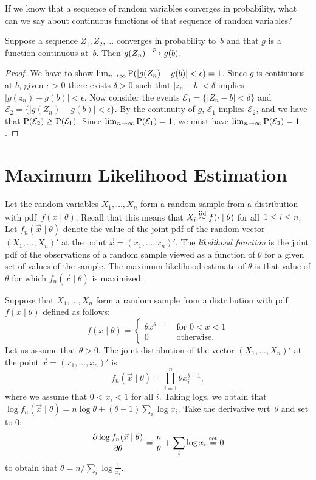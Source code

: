 If we know that a sequence of random variables converges in probability, what 
can we say about continuous functions of that sequence of random variables?
\begin{theorem}
Suppose a sequence $Z_1, Z_2, \ldots$ converges in probability to~$b$ and 
that $g$ is a function continuous at~$b$. Then $g(Z_n) \stackrel{p}{\longrightarrow} g(b)$.
\end{theorem} 
\begin{proof}
We have to show $\lim_{n \to \infty} \operatorname{P} (|g(Z_n) - g(b)| < \epsilon) = 1$. 
Since $g$ is continuous at $b$, given $\epsilon > 0$ there exists $\delta > 0$
such that $|z_n - b| < \delta$ implies $|g(z_n) -  g(b)| < \epsilon$. Now consider
the events $\mathcal{E}_1 = \{ |Z_n - b| < \delta \}$ and 
$\mathcal{E}_2 = \{|g(Z_n) - g(b)| < \epsilon\}$. By the continuity of $g$, 
$\mathcal{E}_1$ implies $\mathcal{E}_2$, and we have that 
$\operatorname{P} (\mathcal{E}_2) \geq \operatorname{P} (\mathcal{E}_1)$. 
Since $\lim_{n \to \infty} \operatorname{P} (\mathcal{E}_1) = 1$, we must have  
$\lim_{n \to \infty} \operatorname{P} (\mathcal{E}_2) = 1$. 
\end{proof}

\section{Maximum Likelihood Estimation}
Let the random variables $X_1, \ldots, X_n$ form a random sample from a 
distribution with pdf~$f(x \mid \theta)$. Recall that this means that 
$X_i \stackrel{\text{iid}}{\sim} f( \cdot \mid \theta)$ for all~$1 \leq i \leq n$. 
Let $f_n(\vec{x} \mid \theta)$ denote the value of the joint pdf of 
the random vector $(X_1, \ldots, X_n)'$ at the point 
$\vec{x} = (x_1, \ldots, x_n)'$. The \emph{likelihood function} is the joint pdf 
of the observations of a random sample viewed as a function of $\theta$ for 
a given set of values of the sample. The maximum likelihood estimate of 
$\theta$ is that value of $\theta$ for which $f_n (\vec{x} \mid \theta)$ is 
maximized. 
\begin{example}
Suppose that $X_1, \ldots, X_n$ form a random sample from a distribution with 
pdf $f(x \mid \theta)$ defined as follows:
\[
    f(x \mid \theta) = 
        \left \{
            \begin{array}{ll}
                \theta x^{\theta - 1} & \text{ for } 0 < x < 1 \\
                0                     & \text{ otherwise}.
            \end{array} 
        \right .
\]
Let us assume that $\theta > 0$. The joint distribution of the vector 
$(X_1, \ldots, X_n)'$ at the point $\vec{x} = (x_1, \ldots, x_n)'$ is 
\[
    f_n (\vec{x} \mid \theta ) = \prod_{i = 1}^n \theta x_i^{\theta - 1},
\]
where we assume that $0 < x_i < 1$ for all $i$. Taking logs, we obtain that
$\log f_n (\vec{x} \mid \theta) = n \log \theta + (\theta - 1) \sum_i \log x_i$. 
Take the derivative wrt~$\theta$ and set to $0$:
\[
    \frac{\partial \log f_n (\vec{x} \mid \theta)}{\partial \theta} = 
        \frac{n}{\theta} + \sum_i \log x_i \stackrel{\text{set}}{=} 0
\]
to obtain that $\theta = n / \sum_i \log \frac{1}{x_i}$.
\end{example}   

